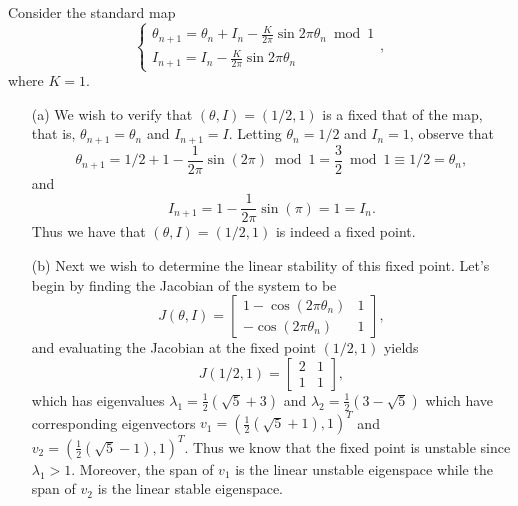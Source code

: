 \documentclass[12pt]{report}
\begin{document}
\begin{solution}

    \noindent
    Consider the standard map
    \begin{equation*}
        \left\{\begin{array}{l}
    \theta_{n+1}=\theta_{n}+I_{n}-\frac{K}{2 \pi} \sin 2 \pi \theta_{n} \bmod 1 \\
    I_{n+1}=I_{n}-\frac{K}{2 \pi} \sin 2 \pi \theta_{n}
    \end{array}\right.,
    \end{equation*}
    where $K=1$.


    \begin{enumerate}
        \item [(a)]
        We wish to verify that $(\theta,I) = (1/2,1)$ is a fixed that of the map, that is, $\theta_{n+1} = \theta_n$ and $I_{n+1} = I$. Letting $\theta_n = 1/2$ and $I_n = 1$, observe that
        \[ 
            \theta_{n+1} = 1/2 + 1 - \frac{1}{2\pi}\sin(2\pi) \bmod 1 = \frac{3}{2} \bmod 1 \equiv 1/2 = \theta_n,
        \]
        and
        \[ 
            I_{n+1} = 1 - \frac{1}{2\pi}\sin(\pi) = 1 = I_n.
        \]
        Thus we have that $(\theta,I) = (1/2,1)$ is indeed a fixed point.

        \item [(b)]
        Next we wish to determine the linear stability of this fixed point. Let's begin by finding the Jacobian of the system to be
        \[ 
            J(\theta,I) = \begin{bmatrix}
                1 - \cos(2 \pi \theta_n) & 1 \\
                -\cos(2 \pi  \theta_n) & 1
            \end{bmatrix},
        \]
        and evaluating the Jacobian at the fixed point $(1/2,1)$ yields
        \[ 
            J(1/2,1) = \begin{bmatrix}
                2 & 1\\
                1 & 1
            \end{bmatrix},
        \]
        which has eigenvalues $\lambda_1 = \frac{1}{2} \left(\sqrt{5}+3\right)$ and $\lambda_2 = \frac{1}{2} \left(3-\sqrt{5}\right)$ which have corresponding eigenvectors $v_1 = (\frac{1}{2} \left(\sqrt{5}+1\right),1)^T$ and $v_2 = (\frac{1}{2} \left(\sqrt{5}-1\right),1)^T$. Thus we know that the fixed point is unstable since $\lambda_1 > 1$. Moreover, the span of $v_1$ is the linear unstable eigenspace while the span of $v_2$ is the linear stable eigenspace.


\end{enumerate}
\end{solution}
\end{document}
